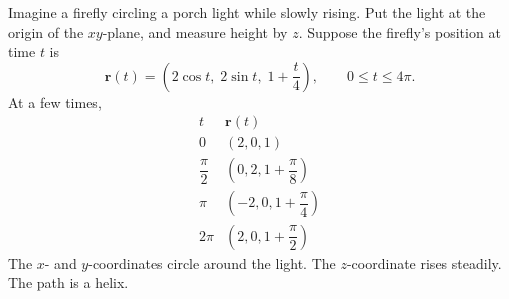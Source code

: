 Imagine a firefly circling a porch light while slowly rising.  Put the light at the origin
of the \(xy\)-plane, and measure height by \(z\).  Suppose the firefly's position at time
\(t\) is
\[
    \mathbf r(t)=\left(2\cos t,\;2\sin t,\;1+\frac{t}{4}\right),
    \qquad 0\le t\le 4\pi.
\]
At a few times,
\[
\begin{array}{c|c}
t & \mathbf r(t) \\ \hline
0 & (2,0,1)\\[1mm]
\dfrac{\pi}{2} & \left(0,2,1+\dfrac{\pi}{8}\right)\\[2mm]
\pi & \left(-2,0,1+\dfrac{\pi}{4}\right)\\[2mm]
2\pi & \left(2,0,1+\dfrac{\pi}{2}\right)
\end{array}
\]
The \(x\)- and \(y\)-coordinates circle around the light.  The \(z\)-coordinate rises
steadily.  The path is a helix.
